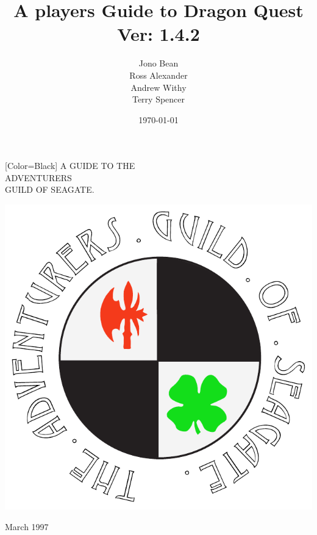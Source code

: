 \documentclass[twoside,a4paper]{article}
\title{A players Guide to Dragon Quest\\Ver: 1.4.2}
\author{Jono Bean\\Ross Alexander\\Andrew Withy\\Terry Spencer}
\date{\Large\today}
\begin{document}
\thispagestyle{empty}
\begin{center}
  {
  [Color=Black]\fontsize{50pt}{60pt}\selectfont
  A GUIDE TO THE \\
  ADVENTURERS \\
  GUILD OF SEAGATE. \\
  }

  \vspace{30mm}
  
\includegraphics{../2020e/cover.pdf}
  
  \vspace{30mm}

{\Huge March 1997}
\end{center}

\clearemptydoublepage

\maketitle

\setcounter{tocdepth}{2}
\tableofcontents

\newpage
\end{document}
